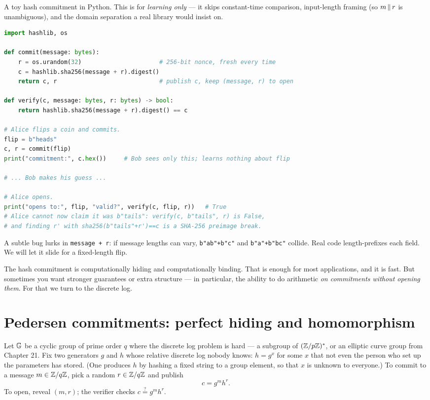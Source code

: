 \begin{implementbox}
A toy hash commitment in Python. This is for \emph{learning only} --- it skips constant-time comparison, input-length framing (so $m\,\|\, r$ is unambiguous), and the domain separation a real library would insist on.
\begin{lstlisting}[language=Python]
import hashlib, os

def commit(message: bytes):
    r = os.urandom(32)                      # 256-bit nonce, fresh every time
    c = hashlib.sha256(message + r).digest()
    return c, r                             # publish c, keep (message, r) to open

def verify(c, message: bytes, r: bytes) -> bool:
    return hashlib.sha256(message + r).digest() == c

# Alice flips a coin and commits.
flip = b"heads"
c, r = commit(flip)
print("commitment:", c.hex())     # Bob sees only this; learns nothing about flip

# ... Bob makes his guess ...

# Alice opens.
print("opens to:", flip, "valid?", verify(c, flip, r))   # True
# Alice cannot now claim it was b"tails": verify(c, b"tails", r) is False,
# and finding r' with sha256(b"tails"+r')==c is a SHA-256 preimage break.
\end{lstlisting}
A subtle bug lurks in \texttt{message + r}: if message lengths can vary, \texttt{b"ab"+b"c"} and \texttt{b"a"+b"bc"} collide. Real code length-prefixes each field. We will let it slide for a fixed-length flip.
\end{implementbox}

The hash commitment is computationally hiding and computationally binding. That is enough for most applications, and it is fast. But sometimes you want stronger guarantees or extra structure --- in particular, the ability to do arithmetic \emph{on commitments without opening them}. For that we turn to the discrete log.

\section{Pedersen commitments: perfect hiding and homomorphism}
\label{ch32:pedersen}

Let $\mathbb{G}$ be a cyclic group of prime order $q$ where the discrete log problem is hard --- a subgroup of $(\mathbb{Z}/p\mathbb{Z})^{*}$, or an elliptic curve group from Chapter 21. Fix two generators $g$ and $h$ whose relative discrete log nobody knows: $h = g^{x}$ for some $x$ that not even the person who set up the parameters has stored. (One produces $h$ by hashing a fixed string to a group element, so that $x$ is unknown to everyone.) To commit to a message $m \in \mathbb{Z}/q\mathbb{Z}$, pick a random $r \in \mathbb{Z}/q\mathbb{Z}$ and publish
\[
  c = g^{m} h^{r}.
\]
To open, reveal $(m, r)$; the verifier checks $c \stackrel{?}{=} g^m h^r$.

